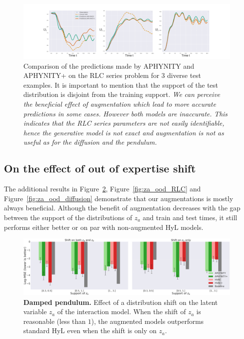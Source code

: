 \documentclass{article}
\newcommand\figref{Figure~\ref}
\begin{document}
\begin{figure}
    \centering
    \includegraphics[width=.98\textwidth]{figures/RLC_examples.png}
    \vspace{-1em}
    \caption{Comparison of the predictions made by APHYNITY and APHYNITY+ on the RLC series problem for 3 diverse test examples. It is important to mention that the support of the test distribution is disjoint from the training support. \textit{We can perceive the beneficial effect of augmentation which lead to more accurate predictions in some cases. However both models are inaccurate. This indicates that the RLC series parameters are not easily identifiable, hence the generative model is not exact and augmentation is not as useful as for the diffusion and the pendulum.}}
    \label{fig:ood_RLC}
\end{figure}
\subsection{On the effect of out of expertise shift}
The additional results in \figref{fig:za_ood_pendulum}, \figref{fig:za_ood_RLC} and \figref{fig:za_ood_diffusion} demonstrate that our augmentations is mostly always beneficial. Although the benefit of augmentation decreases with the gap between the support of the distributions of $z_a$ and train and test times, it still performs either better or on par with non-augmented HyL models.
\begin{figure}
    \centering
    \includegraphics[width=.98\textwidth]{figures/results_log_mse_za_OOD_pendulum.png}
    \caption{\textbf{Damped pendulum.} Effect of a distribution shift on the latent variable $z_a$ of the interaction model. When the shift of $z_a$ is reasonable (less than $1$), the augmented models outperforms standard HyL even when the shift is only on $z_a$.}
    \label{fig:za_ood_pendulum}
\end{figure}
\end{document}
